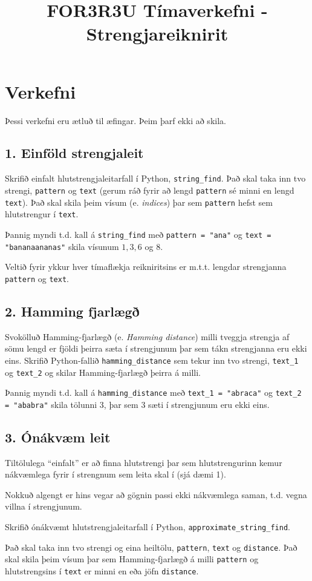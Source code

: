 \documentclass{article}
\title{FOR3R3U Tímaverkefni - Strengjareiknirit}
\begin{document}
\maketitle

\section{Verkefni}
Þessi verkefni eru ætluð til æfingar. Þeim þarf ekki að skila.
\subsection{1. Einföld strengjaleit}
Skrifið einfalt hlutstrengjaleitarfall í Python, \texttt{string\_find}. Það skal taka inn tvo strengi, \texttt{pattern} og \texttt{text} (gerum ráð fyrir að lengd \texttt{pattern} sé minni en lengd \texttt{text}). Það skal skila þeim vísum (e. \emph{indices}) þar sem \texttt{pattern} hefst sem hlutstrengur í \texttt{text}. 

Þannig myndi t.d. kall á \texttt{string\_find} með \texttt{pattern = "ana"} og \texttt{text = "bananaananas"} skila vísunum $1, 3, 6$ og $8$.

Veltið fyrir ykkur hver tímaflækja reikniritsins er m.t.t. lengdar strengjanna \texttt{pattern} og \texttt{text}.

\subsection{2. Hamming fjarlægð}
Svokölluð Hamming-fjarlægð (e. \emph{Hamming distance}) milli tveggja strengja af sömu lengd er fjöldi þeirra sæta í strengjunum þar sem tákn strengjanna eru ekki eins. Skrifið Python-fallið \texttt{hamming\_distance} sem tekur inn tvo strengi, \texttt{text\_1} og \texttt{text\_2} og skilar Hamming-fjarlægð þeirra á milli.

Þannig myndi t.d. kall á \texttt{hamming\_distance} með \texttt{text\_1 = "abraca"} og \texttt{text\_2 = "ababra"} skila tölunni 3, þar sem 3 sæti í strengjunum eru ekki eins.
\subsection{3. Ónákvæm leit}
Tiltölulega ``einfalt'' er að finna hlutstrengi þar sem hlutstrengurinn kemur nákvæmlega fyrir í strengnum sem leita skal í (sjá dæmi 1).

Nokkuð algengt er hins vegar að gögnin passi ekki nákvæmlega saman, t.d. vegna villna í strengjunum.

Skrifið ónákvæmt hlutstrengjaleitarfall í Python, \texttt{approximate\_string\_find}. 

Það skal taka inn tvo strengi og eina heiltölu, \texttt{pattern}, \texttt{text} og \texttt{distance}. Það skal skila þeim vísum þar sem Hamming-fjarlægð á milli \texttt{pattern} og hlutstrengsins í \texttt{text} er minni en eða jöfn \texttt{distance}.
\end{document}
